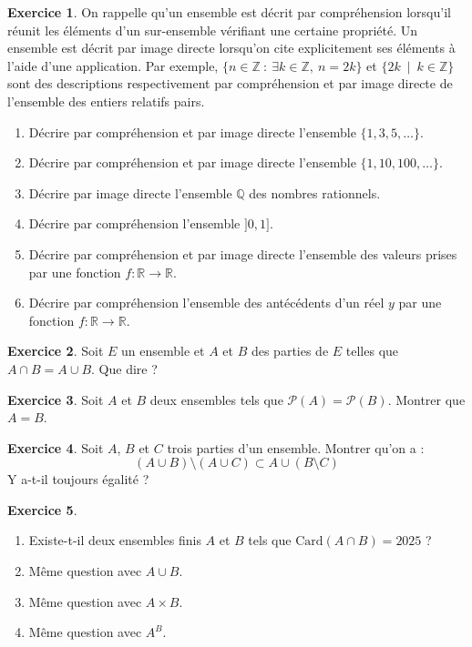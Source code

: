 \documentclass[french]{book}
\newcommand{\Z}{\mathbb{Z}}
\newcommand{\Q}{\mathbb{Q}}
\newcommand{\R}{\mathbb{R}}
\newcommand{\card}{\text{Card}}
\theoremstyle{definition}
\newtheorem{ex}{Exercice}[chapter]
\theoremstyle{theorem}
\theoremstyle{remark}
\begin{document}
\begin{ex}
	On rappelle qu'un ensemble est décrit par compréhension lorsqu'il réunit  les éléments d'un sur-ensemble vérifiant une certaine propriété. Un ensemble est décrit par image directe lorsqu'on cite explicitement ses éléments à l'aide d'une application. Par exemple, $\{n\in\Z\ : \ \exists k\in\Z,\ n=2k\}$ et $\{2k\ \mid \ k\in\Z\}$ sont  des descriptions respectivement par compréhension et par image directe de l'ensemble des entiers relatifs pairs.
	\begin{enumerate}
		\item Décrire par compréhension et par image directe l'ensemble $\{1,3,5,\ldots\}$.
		\item Décrire par compréhension et par image directe l'ensemble $\{1,10,100,\ldots\}$.
		\item Décrire par image directe l'ensemble $\Q$ des nombres rationnels.
		\item Décrire par compréhension l'ensemble $]0,1]$.
		\item Décrire par compréhension et par image directe l'ensemble des valeurs prises par une fonction $f:\R\to\R$.
		\item Décrire par compréhension l'ensemble des antécédents d'un réel $y$ par une fonction $f:\R\to\R$.
	\end{enumerate}
\end{ex}

\begin{ex}
	Soit $E$ un ensemble et $A$ et $B$ des parties de $E$ telles que $A\cap B=A\cup B$. Que dire ?
\end{ex}

\begin{ex}
	Soit $A$ et $B$ deux ensembles tels que $\mathcal{P}(A)=\mathcal{P}(B)$. Montrer que $A=B$.
\end{ex}

\begin{ex}
	Soit $A$, $B$ et $C$ trois parties d'un ensemble. Montrer qu'on a : $$(A\cup B)\setminus(A\cup C)\subset A\cup(B\setminus C)$$ Y a-t-il toujours égalité ?
\end{ex}

\begin{ex}
	\begin{enumerate}
		\item Existe-t-il deux ensembles finis $A$ et $B$ tels que $\card(A\cap B)=2025$ ?
		\item Même question avec $A\cup B$.
		\item Même question avec $A\times B$.
		\item Même question avec $A^B$.
	\end{enumerate}
\end{ex}
\end{document}

